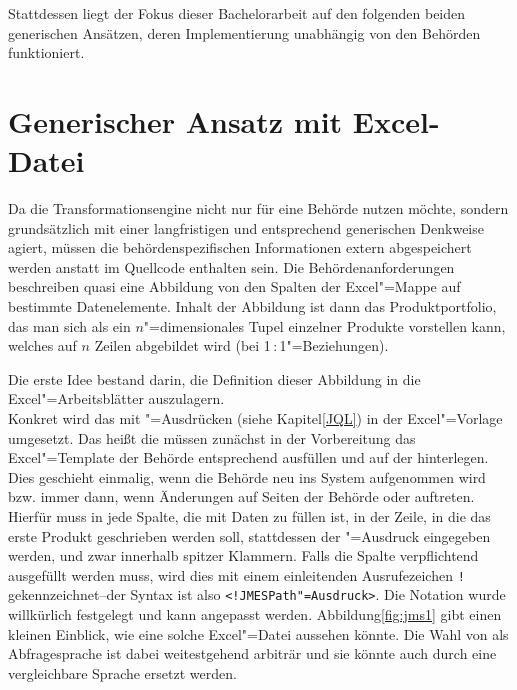 Stattdessen liegt der Fokus dieser Bachelorarbeit auf den folgenden beiden generischen Ansätzen, deren Implementierung unabhängig von den Behörden funktioniert. 




\section{Generischer Ansatz mit Excel-Datei} \label{ED}

Da  die Transformationsengine nicht nur für eine Behörde nutzen möchte, sondern grundsätzlich mit einer langfristigen und entsprechend generischen Denkweise agiert, müssen die behördenspezifischen Informationen extern abgespeichert werden anstatt im Quellcode enthalten sein. Die Behördenanforderungen beschreiben quasi eine Abbildung von den Spalten der Excel"=Mappe auf bestimmte Datenelemente. Inhalt der Abbildung ist dann das Produktportfolio, das man sich als ein $n$"=dimensionales Tupel einzelner Produkte vorstellen kann, welches auf $n$ Zeilen abgebildet wird (bei 1\,:\,1"=Beziehungen).

Die erste Idee bestand darin, die Definition dieser Abbildung in die Excel"=Arbeitsblätter auszulagern.\\
Konkret wird das mit "=Ausdrücken (siehe Kapitel\nbs\ref{JQL}) in der Excel"=Vorlage umgesetzt. Das heißt die  müssen zunächst in der Vorbereitung das Excel"=Template der Behörde entsprechend ausfüllen und auf der  hinterlegen. Dies geschieht einmalig, wenn die Behörde neu ins System aufgenommen wird bzw. immer dann, wenn Änderungen auf Seiten der Behörde oder  auftreten. Hierfür muss in jede Spalte, die mit Daten zu füllen ist, in der Zeile, in die das erste Produkt geschrieben werden soll, stattdessen der "=Ausdruck eingegeben werden, und zwar innerhalb spitzer Klammern. 
Falls die Spalte verpflichtend ausgefüllt werden muss, wird dies mit einem einleitenden Ausrufezeichen \texttt{!} gekennzeichnet\nbs --\nbs der Syntax ist also \texttt{<!JMESPath"=Ausdruck>}. Die Notation wurde willkürlich festgelegt und kann angepasst werden. Abbildung\nbs\ref{fig:jms1} gibt einen kleinen Einblick, wie eine solche Excel"=Datei aussehen könnte. Die Wahl von  als Abfragesprache ist dabei weitestgehend arbiträr und sie könnte auch durch eine vergleichbare Sprache ersetzt werden.

